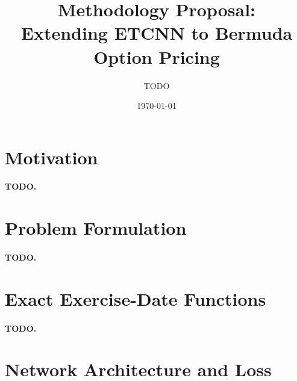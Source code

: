 \documentclass[11pt,a4paper]{article}
\title{Methodology Proposal:\\
Extending ETCNN to Bermuda Option Pricing}
\author{TODO}
\date{\today}
\begin{document}
\maketitle

\section{Motivation}


\paragraph{TODO.}

\section{Problem Formulation}


\paragraph{TODO.}

\section{Exact Exercise-Date Functions}


\paragraph{TODO.}

\section{Network Architecture and Loss}
\end{document}
